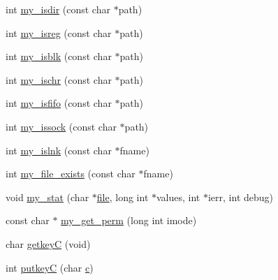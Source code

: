 \begin{DoxyCompactItemize}
\item 
int \hyperlink{C-M__system_8c_a4d9118bb9590e12ac1956789cd08e09b}{my\+\_\+isdir} (const char $\ast$path)
\item 
int \hyperlink{C-M__system_8c_afec6872f4aa34aba9e71a18324d53bce}{my\+\_\+isreg} (const char $\ast$path)
\item 
int \hyperlink{C-M__system_8c_ad07b549d969a0670b0b8f7c6bef83e92}{my\+\_\+isblk} (const char $\ast$path)
\item 
int \hyperlink{C-M__system_8c_ae59ec13b3517e84ddd30a0cd5352a01d}{my\+\_\+ischr} (const char $\ast$path)
\item 
int \hyperlink{C-M__system_8c_ac4f0c51cc048efce7cc88a80c6ce50a4}{my\+\_\+isfifo} (const char $\ast$path)
\item 
int \hyperlink{C-M__system_8c_a090bd041de7e5661c0cb3dea61517283}{my\+\_\+issock} (const char $\ast$path)
\item 
int \hyperlink{C-M__system_8c_a5d15b99bbdd2c6d3e07c92b4bdebb732}{my\+\_\+islnk} (const char $\ast$fname)
\item 
int \hyperlink{C-M__system_8c_afc05a3ec2be734d741c384e752f96b90}{my\+\_\+file\+\_\+exists} (const char $\ast$fname)
\item 
void \hyperlink{C-M__system_8c_a93aa717690d60568cf019988f6434ba5}{my\+\_\+stat} (char $\ast$\hyperlink{what__overview_81_8txt_a447b56c526e8da30e0dc94673727ee25}{file}, long int $\ast$values, int $\ast$ierr, int debug)
\item 
const char $\ast$ \hyperlink{C-M__system_8c_a1ef2ab1c7375f6b130cee762e770a29a}{my\+\_\+get\+\_\+perm} (long int imode)
\item 
char \hyperlink{C-M__system_8c_a00682f21b3d8ff5bbe69bf47e00f60ab}{getkeyC} (void)
\item 
int \hyperlink{C-M__system_8c_a834a89f46bdca2fc961db64cf3112cdf}{putkeyC} (char \hyperlink{c_8f90_aeb1f4e639be0213b4cbd07f2583a5b1f}{c})
\end{DoxyCompactItemize}
